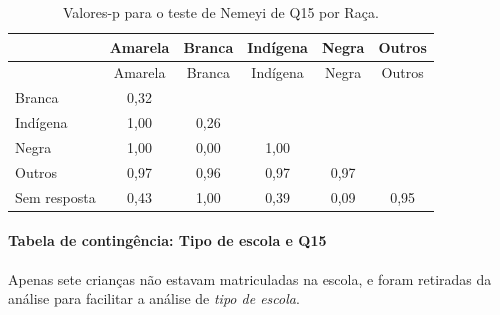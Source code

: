 \documentclass[]{article}
\let\oldparagraph\paragraph
\renewcommand{\paragraph}[1]{\oldparagraph{#1}\mbox{}}
\begin{document}
\begin{longtable}[]{@{}lccccc@{}}
\caption{\label{tab:unnamed-chunk-111}Valores-p para o teste de Nemeyi de Q15 por Raça.}\tabularnewline
\toprule
& Amarela & Branca & Indígena & Negra & Outros\tabularnewline
\midrule
\endfirsthead
\toprule
& Amarela & Branca & Indígena & Negra & Outros\tabularnewline
\midrule
\endhead
Branca & 0,32 & & & &\tabularnewline
Indígena & 1,00 & 0,26 & & &\tabularnewline
Negra & 1,00 & 0,00 & 1,00 & &\tabularnewline
Outros & 0,97 & 0,96 & 0,97 & 0,97 &\tabularnewline
Sem resposta & 0,43 & 1,00 & 0,39 & 0,09 & 0,95\tabularnewline
\bottomrule
\end{longtable}

\cleardoublepage

\hypertarget{tabela-de-continguxeancia-tipo-de-escola-e-q15}{%
\paragraph{Tabela de contingência: Tipo de escola e Q15}\label{tabela-de-continguxeancia-tipo-de-escola-e-q15}}

Apenas sete crianças não estavam matriculadas na escola, e foram retiradas da análise para facilitar a análise de \emph{tipo de escola}.
\end{document}
